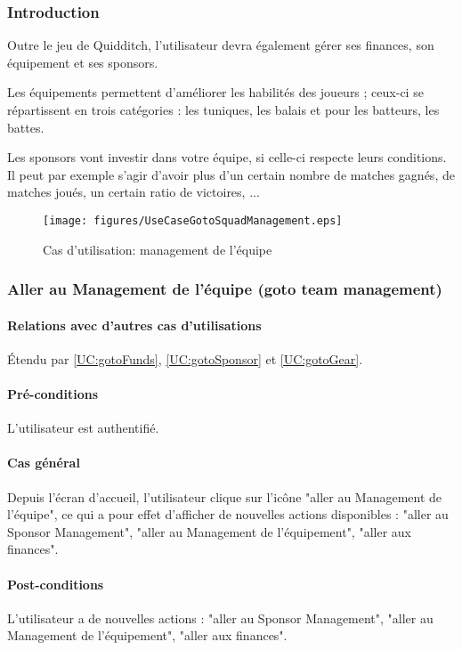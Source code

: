 \subsubsection{Introduction}
Outre le jeu de Quidditch, l'utilisateur devra également gérer ses finances, son équipement et ses sponsors.

Les équipements permettent d'améliorer les habilités des joueurs ; ceux-ci se répartissent en trois catégories : les tuniques, les balais et pour les batteurs, les battes.

Les sponsors vont investir dans votre équipe, si celle-ci respecte leurs conditions. Il peut par exemple s'agir d'avoir plus d'un certain nombre de matches gagnés, de matches joués, un certain ratio de victoires, ...

\begin{figure}[h]
  \centering
  \texttt{[image: figures/UseCaseGotoSquadManagement.eps]}
   \caption{\label{fig:UC:gotoManagement} Cas d'utilisation: management de l'équipe}
\end{figure}

\subsubsection{Aller au Management de l'équipe (goto team management)}
\label{UC:gotoManagement}
\paragraph{Relations avec d'autres cas d'utilisations}
Étendu par \ref{UC:gotoFunds}, \ref{UC:gotoSponsor} et \ref{UC:gotoGear}.
\paragraph{Pré-conditions}
\begin{list}{}{\leftmargin=1.5em}
\item{L'utilisateur est authentifié.}
\end{list}
\paragraph{Cas général}
Depuis l'écran d'accueil, l'utilisateur clique sur l'icône "aller au Management de l'équipe", ce qui a pour effet d'afficher de nouvelles actions disponibles : "aller au Sponsor Management", "aller au Management de l'équipement", "aller aux finances".
\paragraph{Post-conditions}
\begin{list}{}{\leftmargin=1.5em}
\item{L'utilisateur a de nouvelles actions : "aller au Sponsor Management", "aller au Management de l'équipement", "aller aux finances".}
\end{list}


